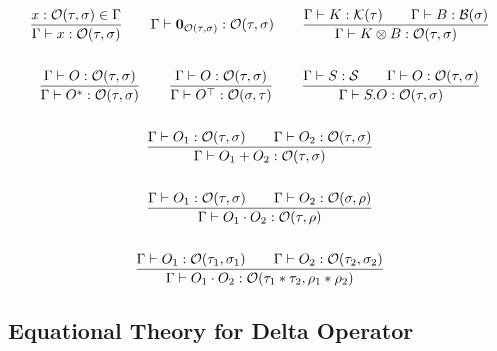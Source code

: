 \begin{definition}
\begin{gather*}
  \frac{x : \mathcal{O}(\tau, \sigma) \in \Gamma}{\Gamma \vdash x : \mathcal{O}(\tau, \sigma)}
  \qquad
  \Gamma \vdash \mathbf{0}_{\mathcal{O}(\tau, \sigma)} : \mathcal{O}(\tau, \sigma) 
  \qquad
  \frac{\Gamma \vdash K : \mathcal{K}(\tau) \qquad \Gamma \vdash B : \mathcal{B}(\sigma)}{\Gamma \vdash K \otimes B : \mathcal{O}(\tau, \sigma)} \\
  \\
  \frac{\Gamma \vdash O : \mathcal{O}(\tau, \sigma)}{\Gamma \vdash O^* : \mathcal{O}(\tau, \sigma)}
  \qquad
  \frac{\Gamma \vdash O : \mathcal{O}(\tau, \sigma)}{\Gamma \vdash O^\top : \mathcal{O}(\sigma, \tau)}
  \qquad
  \frac{\Gamma \vdash S : \mathcal{S} \qquad \Gamma \vdash O : \mathcal{O}(\tau, \sigma)}{\Gamma \vdash S.O : \mathcal{O}(\tau, \sigma)} \\
  \\
  \frac{\Gamma \vdash O_1 : \mathcal{O}(\tau, \sigma) \qquad \Gamma \vdash O_2 : \mathcal{O}(\tau, \sigma)}{\Gamma \vdash O_1 + O_2 : \mathcal{O}(\tau, \sigma)} \\
  \\
  \frac{\Gamma \vdash O_1 : \mathcal{O}(\tau, \sigma) \qquad \Gamma \vdash O_2 : \mathcal{O}(\sigma, \rho)}{\Gamma \vdash O_1 \cdot O_2 : \mathcal{O}(\tau, \rho)} \\
  \\
  \frac{\Gamma \vdash O_1 : \mathcal{O}(\tau_1, \sigma_1) \qquad \Gamma \vdash O_2 : \mathcal{O}(\tau_2, \sigma_2)}{\Gamma \vdash O_1 \cdot O_2 : \mathcal{O}(\tau_1 * \tau_2, \rho_1 * \rho_2)}
\end{gather*}




\end{definition}


\subsection{Equational Theory for Delta Operator}

